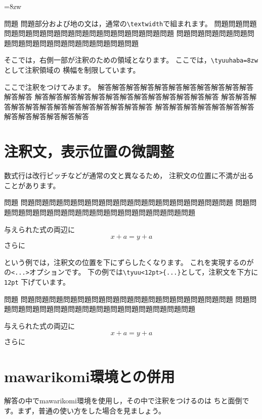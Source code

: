 \documentclass[a4j,fleqn]{jarticle}
\begin{document}
{\tyuuhaba=8zw\relax
\begin{itembox}{問題}
問題部分および地の文は，通常の\verb+\textwidth+で組まれます。
問題問題問題問題問題問題問題問題問題問題問題問題問題問題問題
問題問題問題問題問題問題問題問題問題問題問題問題問題問題問題
\end{itembox}
\begin{tyuukai}
そこでは，右側一部が注釈のための領域となります。
ここでは，\verb+\tyuuhaba=8zw+として注釈領域の
横幅を制限しています。

ここで注釈をつけてみます。
解答解答解答解答解答解答解答解答解答解答解答解答解答
解答解答解答解答解答解答解答解答解答解答解答解答解答
解答解答解答解答解答解答解答解答解答解答解答解答解答
解答解答解答解答解答解答解答解答解答解答解答解答解答
\end{tyuukai}
}
\clearpage
\section{注釈文，表示位置の微調整}
数式行は改行ピッチなどが通常の文と異なるため，
注釈文の位置に不満が出ることがあります。
\begin{itembox}{問題}
問題問題問題問題問題問題問題問題問題問題問題問題問題問題問題
問題問題問題問題問題問題問題問題問題問題問題問題問題問題問題
\end{itembox}
\begin{tyuukai}
与えられた式の両辺に
%
\[ x+a=y+a \]
さらに
\end{tyuukai}
\bigskip

\noindent
という例では，注釈文の位置を下にずらしたくなります。
これを実現するのがの\verb+<...>+オプションです。
下の例では\verb+\tyuu<12pt>{...}+として，注釈文を下方に\texttt{12pt}
下げています。

\begin{itembox}{問題}
問題問題問題問題問題問題問題問題問題問題問題問題問題問題問題
問題問題問題問題問題問題問題問題問題問題問題問題問題問題問題
\end{itembox}
\begin{tyuukai}
与えられた式の両辺に
\tyuu<12pt>{$a$を加えて}%
\[ x+a=y+a \]
さらに
\end{tyuukai}
\clearpage

\section{\textsf{mawarikomi}環境との併用}
解答の中で\textsf{mawarikomi}環境を使用し，その中で注釈をつけるのは
ちと面倒です。まず，普通の使い方をした場合を見ましょう。
\end{document}
